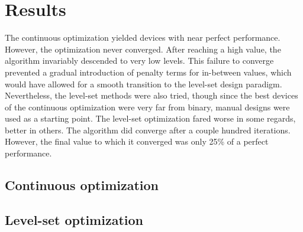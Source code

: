 \chapter{Results}

The continuous optimization yielded devices with near perfect performance.
However, the optimization never converged.
After reaching a high value, the algorithm invariably descended to very low
levels.
This failure to converge prevented a gradual introduction of penalty terms for
in-between values, which would have allowed for a smooth transition to the
level-set design paradigm.
Nevertheless, the level-set methods were also tried,
though since the best devices of the continuous optimization were very far from
binary, manual designs were used as a starting point.
The level-set optimization fared worse in some regards, better in others.
The algorithm did converge after a couple hundred iterations.
However, the final value to which it converged was only 25\% of a perfect
performance.



\section{Continuous optimization}

\begin{figure}[htpb]
	\centering
	\caption{}
	\label{fig:optimal_cont_design}
\end{figure}

\begin{figure}[htpb]
	\centering
	\caption{}
	\label{fig:convergence_plot_cont}
\end{figure}

\section{Level-set optimization}

\begin{figure}[htpb]
	\centering
	\caption{}
	\label{fig:optimal_bin_design}
\end{figure}

\begin{figure}[htpb]
	\centering
	\caption{}
	\label{fig:convergence_plot_bin}
\end{figure}
